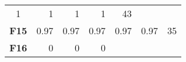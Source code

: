 \documentclass[12pt,a4paper]{article}
\begin{document}
\begin{longtable}[c]{@{}crrrrrr@{}}
\begin{minipage}[t]{0.08\columnwidth}
1
\strut\end{minipage} &
\begin{minipage}[t]{0.09\columnwidth}\raggedleft\strut
1
\strut\end{minipage} &
\begin{minipage}[t]{0.10\columnwidth}\raggedleft\strut
1
\strut\end{minipage} &
\begin{minipage}[t]{0.11\columnwidth}\raggedleft\strut
1
\strut\end{minipage} &
\begin{minipage}[t]{0.07\columnwidth}\raggedleft\strut
43
\strut\end{minipage}\tabularnewline
\begin{minipage}[t]{0.11\columnwidth}\centering\strut
\textbf{F15}
\strut\end{minipage} &
\begin{minipage}[t]{0.07\columnwidth}\raggedleft\strut
0.97
\strut\end{minipage} &
\begin{minipage}[t]{0.08\columnwidth}\raggedleft\strut
0.97
\strut\end{minipage} &
\begin{minipage}[t]{0.09\columnwidth}\raggedleft\strut
0.97
\strut\end{minipage} &
\begin{minipage}[t]{0.10\columnwidth}\raggedleft\strut
0.97
\strut\end{minipage} &
\begin{minipage}[t]{0.11\columnwidth}\raggedleft\strut
0.97
\strut\end{minipage} &
\begin{minipage}[t]{0.07\columnwidth}\raggedleft\strut
35
\strut\end{minipage}\tabularnewline
\begin{minipage}[t]{0.11\columnwidth}\centering\strut
\textbf{F16}
\strut\end{minipage} &
\begin{minipage}[t]{0.07\columnwidth}\raggedleft\strut
0
\strut\end{minipage} &
\begin{minipage}[t]{0.08\columnwidth}\raggedleft\strut
0
\strut\end{minipage} &
\begin{minipage}[t]{0.09\columnwidth}\raggedleft\strut
0
\strut\end{minipage} &
\begin{minipage}[t]{0.10\columnwidth}\raggedleft\strut

\end{minipage}
\end{longtable}
\end{document}
